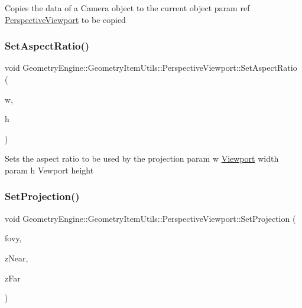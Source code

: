 Copies the data of a Camera object to the current object param ref \mbox{\hyperlink{class_geometry_engine_1_1_geometry_item_utils_1_1_perspective_viewport}{Perspective\+Viewport}} to be copied \mbox{\label{class_geometry_engine_1_1_geometry_item_utils_1_1_perspective_viewport_a916b7090b29f070efe8ca4b91e818182}} 
\subsubsection{\texorpdfstring{SetAspectRatio()}{SetAspectRatio()}}
{\footnotesize\ttfamily void Geometry\+Engine\+::\+Geometry\+Item\+Utils\+::\+Perspective\+Viewport\+::\+Set\+Aspect\+Ratio (\begin{DoxyParamCaption}\item[{int}]{w,  }\item[{int}]{h }\end{DoxyParamCaption})\hspace{0.3cm}{\ttfamily [inline]}}

Sets the aspect ratio to be used by the projection param w \mbox{\hyperlink{class_geometry_engine_1_1_geometry_item_utils_1_1_viewport}{Viewport}} width param h Vewport height \mbox{\label{class_geometry_engine_1_1_geometry_item_utils_1_1_perspective_viewport_ad53e3996cca001300427d04eb340bdee}} 
\subsubsection{\texorpdfstring{SetProjection()}{SetProjection()}}
{\footnotesize\ttfamily void Geometry\+Engine\+::\+Geometry\+Item\+Utils\+::\+Perspective\+Viewport\+::\+Set\+Projection (\begin{DoxyParamCaption}\item[{G\+Ldouble}]{fovy,  }\item[{G\+Ldouble}]{z\+Near,  }\item[{G\+Ldouble}]{z\+Far }\end{DoxyParamCaption})\hspace{0.3cm}{\ttfamily [inline]}}

